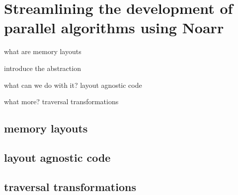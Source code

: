 \chapter{Streamlining the development of parallel algorithms using Noarr}

what are memory layouts 

introduce the abstraction

what can we do with it? layout agnostic code

what more? traversal transformations

\section{memory layouts}

\section{layout agnostic code}

\section{traversal transformations}